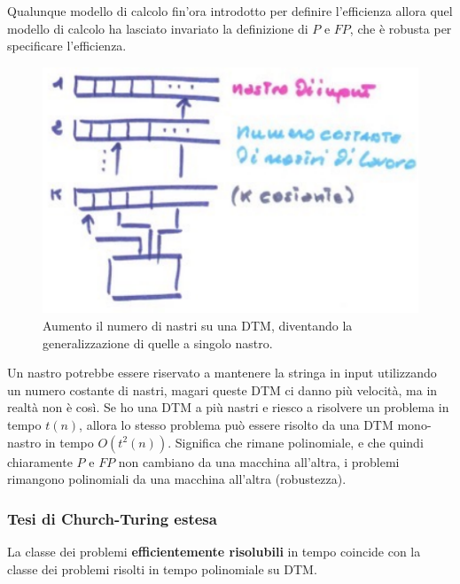 \documentclass{article}
\begin{document}
Qualunque modello di calcolo fin'ora introdotto per definire l'efficienza allora quel
modello di calcolo ha lasciato invariato la definizione di $P$ e $FP$, che è robusta per
specificare l'efficienza.\begin{figure}[H]
    \centering
    \includegraphics[scale=0.6]{images/robustezza.png}
    \caption{Aumento il numero di nastri su una DTM, diventando la generalizzazione
        di quelle a singolo nastro.}
\end{figure}
Un nastro potrebbe essere riservato a mantenere la stringa in input utilizzando un numero
costante di nastri, magari queste DTM ci danno più velocità, ma in realtà non è così. Se ho
una DTM a più nastri e riesco a risolvere un problema in tempo $t(n)$, allora lo stesso
problema può essere risolto da una DTM mono-nastro in tempo $O(t^2(n))$. Significa
che rimane polinomiale, e che quindi chiaramente $P$ e $FP$ non cambiano da una macchina
all'altra, i problemi rimangono polinomiali da una macchina all'altra (robustezza).

\subsubsection{Tesi di Church-Turing estesa}
La classe dei problemi \textbf{efficientemente risolubili} in tempo coincide con
la classe dei problemi risolti in tempo polinomiale su DTM.
\end{document}
